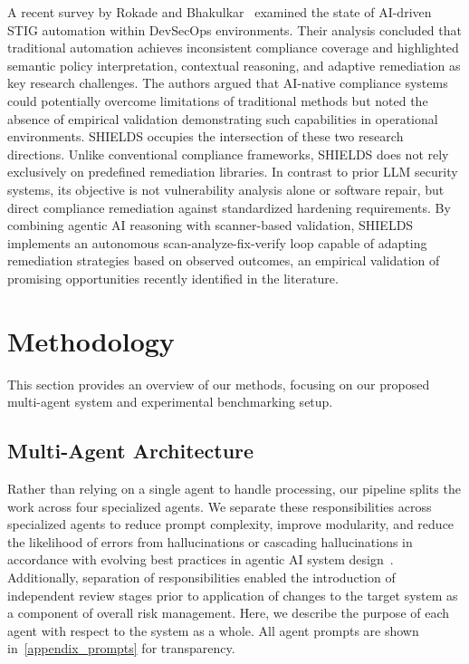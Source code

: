 \documentclass[pdflatex,sn-mathphys-num]{sn-jnl}%
\begin{document}
A recent survey by Rokade and Bhakulkar~\cite{AIcyber2026} examined the state of AI-driven STIG automation within DevSecOps environments. Their analysis concluded that traditional automation achieves inconsistent compliance coverage and highlighted semantic policy interpretation, contextual reasoning, and adaptive remediation as key research challenges. The authors argued that AI-native compliance systems could potentially overcome limitations of traditional methods but noted the absence of empirical validation demonstrating such capabilities in operational environments. SHIELDS occupies the intersection of these two research directions. Unlike conventional compliance frameworks, SHIELDS does not rely exclusively on predefined remediation libraries. In contrast to prior LLM security systems, its objective is not vulnerability analysis alone or software repair, but direct compliance remediation against standardized hardening requirements. By combining agentic AI reasoning with scanner-based validation, SHIELDS implements an autonomous scan-analyze-fix-verify loop capable of adapting remediation strategies based on observed outcomes, an empirical validation of promising opportunities recently identified in the literature.




\section{Methodology}\label{sec:methodology}

This section provides an overview of our methods, focusing on our proposed multi-agent system and experimental benchmarking setup.

\subsection{Multi-Agent Architecture}\label{sec:multiagent}

Rather than relying on a single agent to handle processing, our pipeline splits the work across four specialized agents. We separate these responsibilities across specialized agents to reduce prompt complexity, improve modularity, and reduce the likelihood of errors from hallucinations or cascading hallucinations in accordance with evolving best practices in agentic AI system design~\cite{agenticmindset}. Additionally, separation of responsibilities enabled the introduction of independent review stages prior to application of changes to the target system as a component of overall risk management. Here, we describe the purpose of each agent with respect to the system as a whole. All agent prompts are shown in~\cref{appendix_prompts} for transparency.
\end{document}

